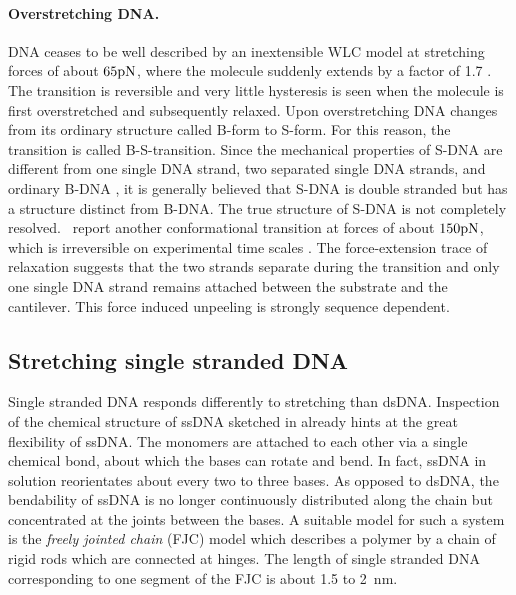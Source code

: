 \paragraph{Overstretching DNA.}
DNA ceases to be well described by an inextensible WLC model at stretching forces of 
about $65\rm pN$, where the molecule suddenly extends by a factor of 1.7  
\cite{Cluzel_Science_96,Smith_Science_96}. The transition is reversible and very little hysteresis
is seen when the molecule is first overstretched and subsequently relaxed. Upon overstretching  
DNA changes from its ordinary structure called B-form to S-form. 
For this reason, the transition is called B-S-transition. Since the mechanical properties of
S-DNA are different from one single DNA strand, two separated single DNA strands, and ordinary B-DNA \cite{Cocco_PRE_04},
it is generally believed that S-DNA is double stranded but has a structure distinct from B-DNA.
The true structure of S-DNA is not completely resolved.
\citeauthor{Rief_NatStructMolBio_99}~report another conformational transition at forces of about
$150\rm pN$, which is irreversible on experimental time scales \cite{Rief_NatStructMolBio_99}. 
The force-extension trace of 
relaxation suggests that the two strands separate during the transition and only one single
DNA strand remains attached between the substrate and the cantilever. This force induced
unpeeling is strongly sequence dependent. 

\subsection{\label{sec:stretching_ssDNA}Stretching single stranded DNA}
Single stranded DNA responds differently to stretching than dsDNA. Inspection of the 
chemical structure of ssDNA sketched in  already hints at the great flexibility 
of ssDNA. The monomers are attached to each other via a single chemical bond, about which 
the bases can rotate and bend. In fact, ssDNA in solution reorientates about every two to three
bases. As opposed to dsDNA, the bendability of ssDNA is no longer continuously distributed 
along the chain but concentrated at the joints between the bases. A suitable model for such a system
is the \emph{freely jointed chain} (FJC) model which describes a polymer by a chain of rigid rods which are
connected at hinges. The length of single stranded DNA  corresponding to one segment of the FJC is 
about 1.5 to 2~nm. 

